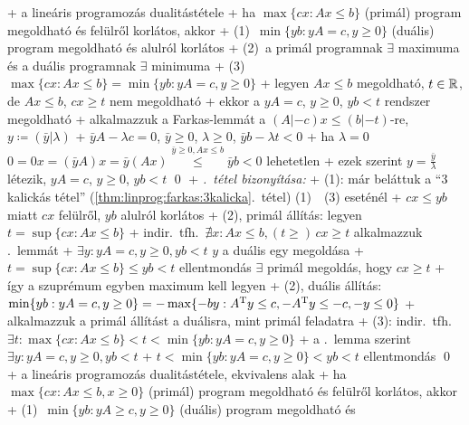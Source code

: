 
+ \thm \label{thm:linprog:dual:dual}a lineáris programozás dualitástétele
  + ha $\max \{ cx : Ax \le b \}$ (primál) program megoldható és
    felülről korlátos, akkor
    + (1)~$\min \{ yb : yA = c, y \ge 0 \}$ (duális) program megoldható és
      alulról korlátos
    + (2)~a primál programnak $\exists$ maximuma és a duális programnak
      $\exists$ minimuma
    + (3)~$\max \{ cx : Ax \le b \} = \min \{ yb : yA = c, y \ge 0 \}$
+ \lemma \label{lem:linprog:dual:t}legyen $A x \le b$ megoldható, $t
  \in \mathbb{R}$, de $A x \le b$, $cx \ge t$ nem megoldható
  + ekkor a $yA = c$, $y \ge 0$, $yb < t$ rendszer megoldható
  + \proof alkalmazzuk a Farkas-lemmát a $(A|-c) x \le (b|-t)$-re, $y
    \coloneqq (\bar{y}|\lambda)$
    + $\bar{y} A - \lambda c = 0$, $\bar{y} \ge 0$, $\lambda \ge 0$,
      $\bar{y} b - \lambda t < 0$
    + ha $\lambda = 0$ \RA $0 = 0 x = (\bar{y} A) x = \bar{y} (Ax)
      \overset{\bar{y} \ge 0, Ax \le b}{\le} \bar{y} b < 0$ \RA%
      lehetetlen
    + ezek szerint $y = \frac{\bar{y}}{\lambda}$ létezik, $y A = c$,
      $y \ge 0$, $yb < t$ \qed
+ \emph{.~tétel bizonyítása:}
  + (1): már beláttuk a ``3 kalickás tétel''
  (\ref{thm:linprog:farkas:3kalicka}.~tétel) (1)~\LRA~(3) eseténél
    + $cx \le yb$ miatt $cx$ felülről, $yb$ alulról korlátos
  + (2), primál állítás: legyen $t = \sup \{ cx : Ax \le b \}$
    + indir.~tfh.~$\nexists x : Ax \le b, (t \ge )\,cx \ge t$ \RA alkalmazzuk
    .~lemmát
    + $\exists y : yA = c, y \ge 0, yb < t$ \RA $y$ a duális egy
      megoldása
    +  $t = \sup \{ cx : Ax \le b \} \le yb < t$ \RA ellentmondás \RA $\exists$ primál
      megoldás, hogy $cx \ge t$
    + így a szuprémum egyben maximum kell legyen
  + (2), duális állítás: $\min \{ yb : yA = c, y \ge 0 \} = - \max \{
    -by : A^{\mathrm{T}} y \le c, -A^{\mathrm{T}} y \le -c, -y \le 0 \}$
    + alkalmazzuk a primál állítást a duálisra, mint primál feladatra
  + (3): indir.~tfh.~$\exists t : \max \{ cx : Ax \le b \} < t < \min
    \{ yb : yA = c, y \ge 0 \}$
    + a .~lemma szerint $\exists y : yA = c,
      y \ge 0, yb < t$
    + $t < \min \{ yb : yA = c, y \ge 0 \} < yb < t$ \RA ellentmondás
    \qed
+ \thm \label{thm:linprog:dual:dual-evk}a lineáris programozás
  dualitástétele, ekvivalens alak
  + ha $\max \{ cx : Ax \le b, x \ge 0 \}$ (primál) program megoldható és
    felülről korlátos, akkor
    + (1)~$\min \{ yb : yA \ge c, y \ge 0 \}$ (duális) program megoldható és
